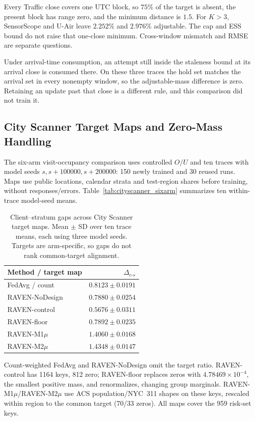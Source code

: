 Every Traffic close covers one UTC block, so $75\%$ of the target is absent,
the present block has range zero, and the minimum distance is $1.5$. For
$K>3$, SensorScope and U-Air leave $2.252\%$ and $2.976\%$ adjustable. The cap
and ESS bound do not raise that one-close minimum. Cross-window mismatch and
RMSE are separate questions.

Under arrival-time consumption, an attempt still inside the staleness bound
at its arrival close is consumed there. On these three traces the hold set
matches the arrival set in every nonempty window, so the adjustable-mass
difference is zero. Retaining an update past that close is a different rule,
and this comparison did not train it.

\subsection{City Scanner Target Maps and Zero-Mass Handling}

The six-arm visit-occupancy comparison uses controlled $O/U$ and ten traces
with model seeds $s,s+100000,s+200000$: 150 newly trained and 30 reused runs.
Maps use public locations, calendar strata and test-region shares before
training, without responses/errors. Table~\ref{tab:cityscanner_sixarm}
summarizes ten within-trace model-seed means.

\begin{table}[!htbp]
\centering
\caption{Client--stratum gaps across City Scanner target maps.
Mean $\pm$ SD over ten trace means, each using three model seeds.
Targets are arm-specific, so gaps do not rank common-target alignment.}
\label{tab:cityscanner_sixarm_cs}
\footnotesize
\begin{tabular}{lr}
\toprule
Method / target map & $\Delta_{c\text{-}s}$\\
\midrule
FedAvg / count & $0.8123{\pm}0.0191$\\
RAVEN-NoDesign & $0.7880{\pm}0.0254$\\
RAVEN-control & $0.5676{\pm}0.0311$\\
RAVEN-floor & $0.7892{\pm}0.0235$\\
RAVEN-M1$\mu$ & $1.4060{\pm}0.0168$\\
RAVEN-M2$\mu$ & $1.4348{\pm}0.0147$\\
\bottomrule
\end{tabular}
\end{table}

Count-weighted FedAvg and RAVEN-NoDesign omit the target ratio.
RAVEN-control has 1164 keys, 812 zero; RAVEN-floor replaces zeros with
$4.78469\times10^{-4}$, the smallest positive mass, and renormalizes,
changing group marginals. RAVEN-M1$\mu$/RAVEN-M2$\mu$ use ACS population/NYC~311
shapes on these keys, rescaled within region to the common target (70/33 zeros).
All maps cover the 959 risk-set keys.

